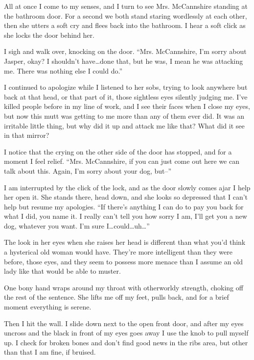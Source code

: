 All at once I come to my senses, and I turn to see Mrs. McCannshire
standing at the bathroom door. For a second we both stand staring
wordlessly at each other, then she utters a soft cry and flees back
into the bathroom. I hear a soft click as she locks the door behind
her.



I sigh and walk over, knocking on the door. ``Mrs. McCannshire, I'm
sorry about Jasper, okay? I shouldn't have{\ldots}done that, but he was,
I mean he was attacking me. There was nothing else I could
do.''



I continued to apologize while I listened to her sobs, trying to
look anywhere but back at that head, or that part of it, those
sightless eyes silently judging me. I've killed people before in my
line of work, and I see their faces when I close my eyes, but now
this mutt was getting to me more than any of them ever did. It was
an irritable little thing, but why did it up and attack me like
that? What did it see in that mirror?



I notice that the crying on the other side of the door has stopped,
and for a moment I feel relief. ``Mrs. McCannshire, if you can just
come out here we can talk about this. Again, I'm sorry about your
dog, but--''



I am interrupted by the click of the lock, and as the door slowly
comes ajar I help her open it. She stands there, head down, and she
looks so depressed that I can't help but resume my apologies. ``If
there's anything I can do to pay you back for what I did, you name
it. I really can't tell you how sorry I am, I'll get you a new dog,
whatever you want. I'm sure I{\ldots}could{\ldots}uh{\ldots}''



The look in her eyes when she raises her head is different than
what you'd think a hysterical old woman would have. They're more
intelligent than they were before, those eyes, and they seem to
possess more menace than I assume an old lady like that would be
able to muster.



One bony hand wraps around my throat with otherworldy strength,
choking off the rest of the sentence. She lifts me off my feet,
pulls back, and for a brief moment everything is serene.



Then I hit the wall. I slide down next to the open front door, and
after my eyes uncross and the black in front of my eyes goes away I
use the knob to pull myself up. I check for broken bones and don't
find good news in the ribs area, but other than that I am fine, if
bruised.



